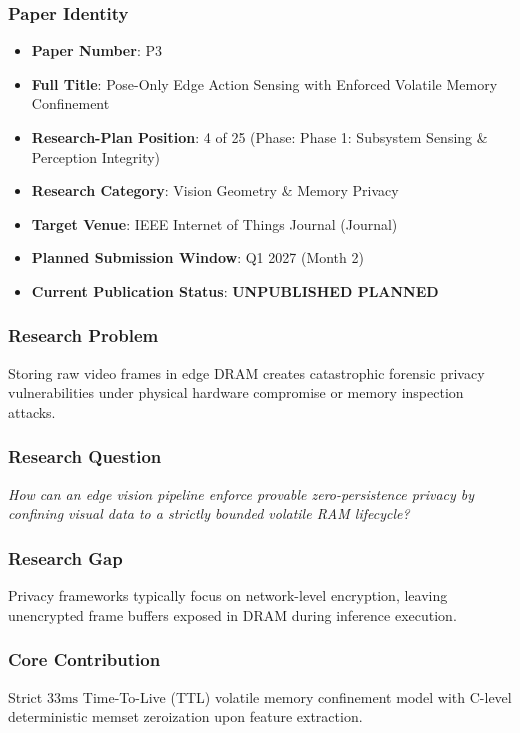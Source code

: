 \documentclass[11pt,letterpaper]{article}
\begin{document}
\subsubsection{Paper Identity}
\begin{itemize}[leftmargin=*]
    \item \textbf{Paper Number}: P3
    \item \textbf{Full Title}: Pose-\allowbreak Only Edge Action Sensing with Enforced Volatile Memory Confinement
    \item \textbf{Research-Plan Position}: 4 of 25 (Phase: Phase 1: Subsystem Sensing \& Perception Integrity)
    \item \textbf{Research Category}: Vision Geometry \& Memory Privacy
    \item \textbf{Target Venue}: IEEE Internet of Things Journal (Journal)
    \item \textbf{Planned Submission Window}: Q1 2027 (Month 2)
    \item \textbf{Current Publication Status}: \textbf{UNPUBLISHED PLANNED}
\end{itemize}

\subsubsection{Research Problem}
Storing raw video frames in edge DRAM creates catastrophic forensic privacy vulnerabilities under physical hardware compromise or memory inspection attacks.

\subsubsection{Research Question}
\begin{tcolorbox}[colback=blue!3!white,colframe=blue!50!black,title=Primary Scientific Question]
\textit{How can an edge vision pipeline enforce provable zero-\allowbreak persistence privacy by confining visual data to a strictly bounded volatile RAM lifecycle?}
\end{tcolorbox}

\subsubsection{Research Gap}
Privacy frameworks typically focus on network-\allowbreak level encryption, leaving unencrypted frame buffers exposed in DRAM during inference execution.

\subsubsection{Core Contribution}
Strict $33\text{ms}$ Time-\allowbreak To-\allowbreak Live (TTL) volatile memory confinement model with C-\allowbreak level deterministic memset zeroization upon feature extraction.
\end{document}
